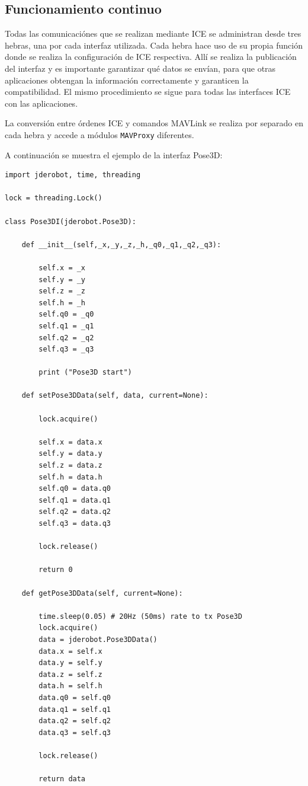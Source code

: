 \subsection{Funcionamiento continuo}

Todas las comunicaciónes que se realizan mediante ICE se administran desde tres hebras, una por cada interfaz utilizada. Cada hebra hace uso de su propia función donde se realiza la configuración de ICE respectiva. Allí se realiza la publicación del interfaz y es importante garantizar qué datos se envían, para que otras aplicaciones obtengan la información correctamente y garanticen la compatibilidad. El mismo procedimiento se sigue para todas las interfaces ICE con las aplicaciones.

La conversión entre órdenes ICE y comandos MAVLink se realiza por separado en cada hebra y accede a módulos \texttt{MAVProxy} diferentes.

A continuación se muestra el ejemplo de la interfaz Pose3D:

\begin{lstlisting}[frame=single]
import jderobot, time, threading

lock = threading.Lock()

class Pose3DI(jderobot.Pose3D):

    def __init__(self,_x,_y,_z,_h,_q0,_q1,_q2,_q3):

        self.x = _x
        self.y = _y
        self.z = _z
        self.h = _h
        self.q0 = _q0
        self.q1 = _q1
        self.q2 = _q2
        self.q3 = _q3

        print ("Pose3D start")

    def setPose3DData(self, data, current=None):

        lock.acquire()

        self.x = data.x
        self.y = data.y
        self.z = data.z
        self.h = data.h
        self.q0 = data.q0
        self.q1 = data.q1
        self.q2 = data.q2
        self.q3 = data.q3

        lock.release()

        return 0

    def getPose3DData(self, current=None):

        time.sleep(0.05) # 20Hz (50ms) rate to tx Pose3D
        lock.acquire()
        data = jderobot.Pose3DData()
        data.x = self.x
        data.y = self.y
        data.z = self.z
        data.h = self.h
        data.q0 = self.q0
        data.q1 = self.q1
        data.q2 = self.q2
        data.q3 = self.q3

        lock.release()

        return data
\end{lstlisting}  


